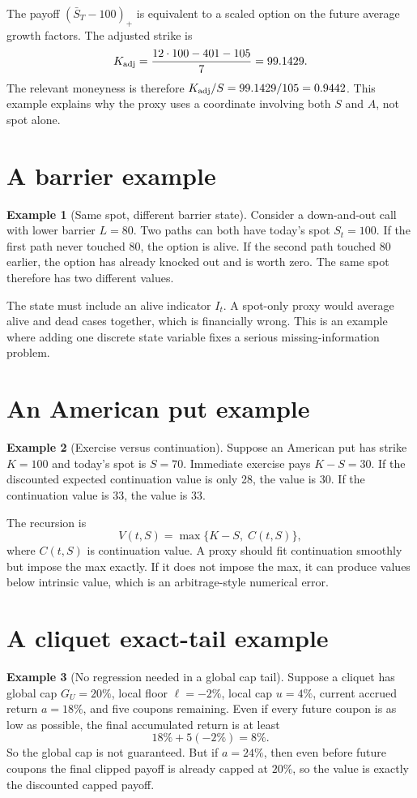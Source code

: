 \documentclass[11pt,oneside]{book}
\theoremstyle{definition}
\newtheorem{example}{Example}[chapter]
\begin{document}
The payoff \((\bar S_T-100)_+\) is equivalent to a scaled option on the future average growth factors. The adjusted strike is
\[
  K_{\rm adj}
  =
  \frac{12\cdot100-401-105}{7}
  =
  99.1429.
\]
The relevant moneyness is therefore \(K_{\rm adj}/S=99.1429/105=0.9442\). This example explains why the proxy uses a coordinate involving both \(S\) and \(A\), not spot alone.

\section{A barrier example}
\begin{example}[Same spot, different barrier state]
Consider a down-and-out call with lower barrier \(L=80\). Two paths can both have today's spot \(S_t=100\). If the first path never touched 80, the option is alive. If the second path touched 80 earlier, the option has already knocked out and is worth zero. The same spot therefore has two different values.
\end{example}

The state must include an alive indicator \(I_t\). A spot-only proxy would average alive and dead cases together, which is financially wrong. This is an example where adding one discrete state variable fixes a serious missing-information problem.

\section{An American put example}
\begin{example}[Exercise versus continuation]
Suppose an American put has strike \(K=100\) and today's spot is \(S=70\). Immediate exercise pays \(K-S=30\). If the discounted expected continuation value is only 28, the value is 30. If the continuation value is 33, the value is 33.
\end{example}

The recursion is
\[
  V(t,S)=\max\{K-S,\;C(t,S)\},
\]
where \(C(t,S)\) is continuation value. A proxy should fit continuation smoothly but impose the max exactly. If it does not impose the max, it can produce values below intrinsic value, which is an arbitrage-style numerical error.

\section{A cliquet exact-tail example}
\begin{example}[No regression needed in a global cap tail]
Suppose a cliquet has global cap \(G_U=20\%\), local floor \(\ell=-2\%\), local cap \(u=4\%\), current accrued return \(a=18\%\), and five coupons remaining. Even if every future coupon is as low as possible, the final accumulated return is at least
\[
  18\%+5(-2\%)=8\%.
\]
So the global cap is not guaranteed. But if \(a=24\%\), then even before future coupons the final clipped payoff is already capped at \(20\%\), so the value is exactly the discounted capped payoff.
\end{example}
\end{document}
